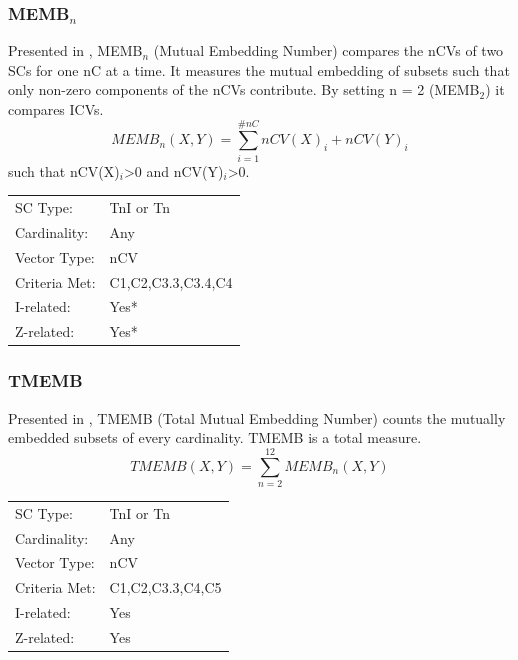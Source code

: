 \documentclass{article}
\begin{document}
\subsubsection{MEMB$_{n}$}
\label{sec-11-6-2}

Presented in \citet[pp. 492]{Rahn1979}, MEMB$_{n}$ (Mutual Embedding
Number) compares the nCVs of two SCs for one nC at a time. It measures
the mutual embedding of subsets such that only non-zero components of
the nCVs contribute. By setting n = 2 (MEMB$_{2}$) it compares ICVs.
$$MEMB_{n}\left(X,Y\right)=\sum_{i=1}^{\#nC}{nCV(X)_{i}+nCV(Y)_{i}}$$
such that nCV(X)$_{i}$>0 and nCV(Y)$_{i}$>0. 

\begin{center}
\begin{tabular}{ll}
 SC Type:       &  TnI or Tn           \\
 Cardinality:   &  Any                 \\
 Vector Type:   &  nCV                 \\
 Criteria Met:  &  C1,C2,C3.3,C3.4,C4  \\
 I-related:     &  Yes*                \\
 Z-related:     &  Yes*                \\
\end{tabular}
\end{center}
\subsubsection{TMEMB}
\label{sec-11-6-3}

Presented in \citet[pp. 492]{Rahn1979}, TMEMB (Total Mutual Embedding
Number) counts the mutually embedded subsets of every
cardinality. TMEMB is a total measure.
$$TMEMB\left(X,Y\right)=\sum_{n=2}^{12}MEMB_{n}\left(X,Y\right)$$

\begin{center}
\begin{tabular}{ll}
 SC Type:       &  TnI or Tn         \\
 Cardinality:   &  Any               \\
 Vector Type:   &  nCV               \\
 Criteria Met:  &  C1,C2,C3.3,C4,C5  \\
 I-related:     &  Yes               \\
 Z-related:     &  Yes               \\
\end{tabular}
\end{center}
\end{document}
